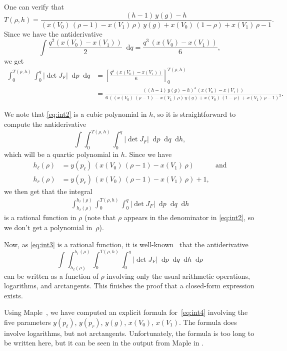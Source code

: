 \documentclass{article}
\newcommand*\diff{\mathop{}\!\mathrm{d}}
\begin{document}
One can verify that
\[
T(\rho,h) = \frac{(h - 1)\, y(g) - h}{(x(V_0)\, (\rho-1) - x(V_1)\,\rho)\, y(g) + x(V_0)\, (1 - \rho) + x(V_1)\, \rho - 1}.
\]
Since we have the antiderivative
\[
\int \frac{q^2(x(V_0) - x(V_1))}2 \diff q = \frac{q^3\, (x(V_0) - x(V_1))}6,
\]
we get
\begin{align}
\int_0^{T(\rho,h)}
\int_0^{q}
\left\vert \det J_F\right\vert \diff p \diff q & =
\left[
\frac{q^3\, (x(V_0) - x(V_1))}6
\right]_0^{T(\rho,h)} \nonumber \\
& = \frac{((h - 1)\, y(g) - h)^3\, (x(V_0) - x(V_1))}{6\, ((x(V_0)\, (\rho-1) - x(V_1)\,\rho)\, y(g) + x(V_0)\, (1 - \rho) + x(V_1)\, \rho - 1)^3}. \label{eq:int2}
\end{align}

We note that \eqref{eq:int2} is a cubic polynomial in $h$, so it is straightforward to compute the antiderivative
\[
\int
\int_0^{T(\rho,h)}
\int_0^{q}
\left\vert \det J_F\right\vert \diff p \diff q \diff h,
\]
which will be a quartic polynomial in $h$.
Since we have
\begin{align*}
h_\ell(\rho) & = y(p_\ell)\, (x(V_0)\, (\rho-1) - x(V_1)\, \rho)\quad\quad\quad \textrm{and} \\
h_r(\rho) & = y(p_r)\, (x(V_0)\, (\rho-1) - x(V_1)\, \rho) +1,
\end{align*}
we then get that the integral
\begin{align}
\int_{h_\ell(\rho)}^{h_r(\rho)}
\int_0^{T(\rho,h)}
\int_0^{q}
\left\vert \det J_F\right\vert \diff p \diff q \diff h \label{eq:int3}
\end{align}
is a rational function in $\rho$ (note that $\rho$ appears in the denominator in \eqref{eq:int2}, so we don't get a polynomial in~$\rho$).

Now, as \eqref{eq:int3} is a rational function, it is well-known~\cite[ch.~2]{bronstein2005symbolic} that the antiderivative
\[
\int
\int_{h_\ell(\rho)}^{h_r(\rho)}
\int_0^{T(\rho,h)}
\int_0^{q}
\left\vert \det J_F\right\vert \diff p \diff q \diff h \diff\rho
\]
can be written as a function of $\rho$ involving only the usual arithmetic operations, logarithms, and arc\-tangents.
This finishes the proof that a closed-form expression exists.

Using Maple~\cite{maple}, we have computed an explicit formula for~\eqref{eq:int4} involving the five parameters $y(p_\ell)$, $y(p_r)$, $y(g)$, $x(V_0)$, $x(V_1)$.
The formula does involve logarithms, but not arctangents.
Unfortunately, the formula is too long to be written here, but it can be seen in the output from Maple in .
\end{document}
